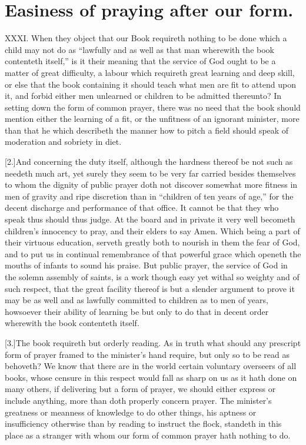 \section*{Easiness of praying after our form.}
XXXI. When they object that our Book requireth nothing to be done which a child may not do as “lawfully and as well as that man wherewith the book contenteth itself,” is it their meaning that the service of God ought to be a matter of great difficulty, a labour which requireth great learning and  deep skill, or else that the book containing it should teach what men are fit to attend upon it, and forbid either men unlearned or children to be admitted thereunto?
 In setting down the form of common prayer, there was no need that the book should mention either the learning of a fit, or the unfitness of an ignorant minister, more than that he which describeth the manner how to pitch a field should speak of moderation and sobriety in diet.

[2.]And concerning the duty itself, although the hardness thereof be not such as needeth much art, yet surely they seem to be very far carried besides themselves to whom the dignity of public prayer doth not discover somewhat more fitness in men of gravity and ripe discretion than in “children of ten years of age,” for the decent discharge and performance of that office. It cannot be that they who speak thus should thus judge. At the board and in private it very well becometh children’s innocency to pray, and their elders to say Amen. Which being a part of their virtuous education, serveth greatly both to nourish in them the fear of God, and to put us in continual remembrance of that powerful grace which openeth the mouths of infants to sound his praise. But public prayer, the service of God in the solemn assembly of saints, is a work though easy yet withal so weighty and of such respect, that the great facility thereof is but a slender argument to prove it may be as well and as lawfully committed to children as to men of years, howsoever their ability of learning be but only to do that in decent order wherewith the book contenteth itself.

[3.]The book requireth but orderly reading. As in truth what should any prescript form of prayer framed to the minister’s hand require, but only so to be read as behoveth? We know that there are in the world certain voluntary overseers of all books, whose censure in this respect would fall as sharp on us as it hath done on many others, if delivering but a form of prayer, we should either express or include anything, more than doth properly concern prayer. The minister’s greatness or meanness of knowledge to do other things,  his aptness or insufficiency otherwise than by reading to instruct the flock, standeth in this place as a stranger with whom our form of common prayer hath nothing to do.


